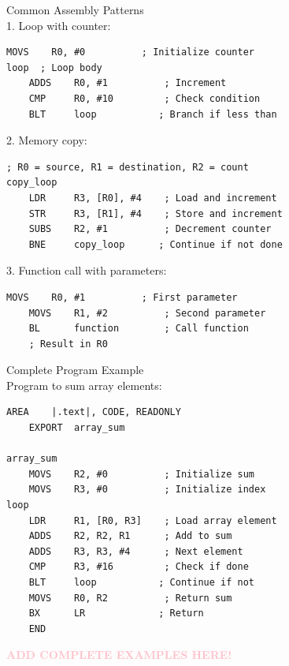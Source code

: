 \begin{code}{Common Assembly Patterns}\\
1. Loop with counter:
\begin{lstlisting}[language=armasm, style=basesmol]
    MOVS    R0, #0          ; Initialize counter
loop  ; Loop body
    ADDS    R0, #1          ; Increment
    CMP     R0, #10         ; Check condition
    BLT     loop           ; Branch if less than
\end{lstlisting}

2. Memory copy:
\begin{lstlisting}[language=armasm, style=basesmol]
    ; R0 = source, R1 = destination, R2 = count
copy_loop
    LDR     R3, [R0], #4    ; Load and increment
    STR     R3, [R1], #4    ; Store and increment
    SUBS    R2, #1          ; Decrement counter
    BNE     copy_loop      ; Continue if not done
\end{lstlisting}

3. Function call with parameters:
\begin{lstlisting}[language=armasm, style=basesmol]
    MOVS    R0, #1          ; First parameter
    MOVS    R1, #2          ; Second parameter
    BL      function        ; Call function
    ; Result in R0
\end{lstlisting}
\end{code}

\begin{example2}{Complete Program Example}\\
Program to sum array elements:
\begin{lstlisting}[language=armasm, style=basesmol]
    AREA    |.text|, CODE, READONLY
    EXPORT  array_sum
        
array_sum
    MOVS    R2, #0          ; Initialize sum
    MOVS    R3, #0          ; Initialize index
loop
    LDR     R1, [R0, R3]    ; Load array element
    ADDS    R2, R2, R1      ; Add to sum
    ADDS    R3, R3, #4      ; Next element
    CMP     R3, #16         ; Check if done
    BLT     loop           ; Continue if not
    MOVS    R0, R2          ; Return sum
    BX      LR             ; Return
    END
\end{lstlisting}
\end{example2}

\textcolor{pink}{\textbf{ADD COMPLETE EXAMPLES HERE!}}


